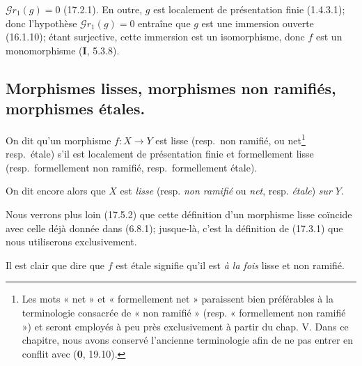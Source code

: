 $\mathscr{G}r_1(g)=0$ (17.2.1). En outre, $g$ est localement de présentation finie (1.4.3.1); donc l'hypothèse $\mathscr{G}r_1(g)=0$ entraîne que $g$ est une immersion ouverte (16.1.10); étant surjective, cette immersion est un isomorphisme, donc $f$ est un monomorphisme (\textbf{I}, 5.3.8).

\subsection{Morphismes lisses, morphismes non ramifiés, morphismes étales.}

\begin{definition}[17.3.1]
On dit qu'un morphisme $f:X\to Y$ est lisse \textup{(resp.}\ non ramifié, \textup{ou} net\footnote{Les mots « net » et « formellement net » paraissent bien préférables à la terminologie consacrée de « non ramifié » (resp. « formellement non ramifié ») et seront employés à peu près exclusivement à partir du chap. V. Dans ce chapitre, nous avons conservé l'ancienne terminologie afin de ne pas entrer en conflit avec (\textbf{0}, 19.10).} \textup{resp.}\ étale\textup{)} s'il est localement de présentation finie et formellement lisse \textup{(resp.}\ formellement non ramifié, \textup{resp.}\ formellement étale\textup{)}.
\end{definition}

On dit encore alors que $X$ est \emph{lisse} (resp. \emph{non ramifié} ou \emph{net}, resp. \emph{étale}) \emph{sur} $Y$.

Nous verrons plus loin (17.5.2) que cette définition d'un morphisme lisse coïncide avec celle déjà donnée dans (6.8.1); jusque-là, c'est la définition de (17.3.1) que nous utiliserons exclusivement.

Il est clair que dire que $f$ est étale signifie qu'il est \emph{à la fois} lisse et non ramifié.

